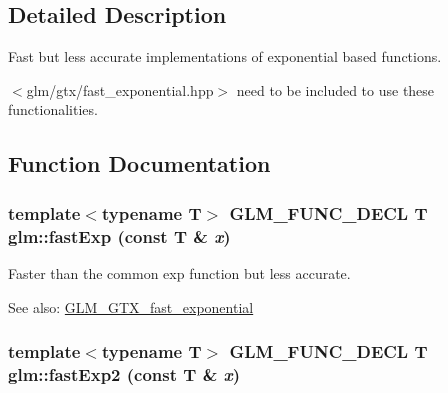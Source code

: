 \subsection{Detailed Description}
Fast but less accurate implementations of exponential based functions. 

$<$glm/gtx/fast\_\-exponential.hpp$>$ need to be included to use these functionalities. 

\subsection{Function Documentation}
\hypertarget{group__gtx__fast__exponential_g40d33b6bb8287eac031ee6226f1e2285}{
\subsubsection[fastExp]{\setlength{\rightskip}{0pt plus 5cm}template$<$typename T$>$ GLM\_\-FUNC\_\-DECL T glm::fastExp (const T \& {\em x})}}
\label{group__gtx__fast__exponential_g40d33b6bb8287eac031ee6226f1e2285}


Faster than the common exp function but less accurate. \begin{Desc}
\item[See also:]\hyperlink{group__gtx__fast__exponential}{GLM\_\-GTX\_\-fast\_\-exponential} \end{Desc}
\hypertarget{group__gtx__fast__exponential_g4279c1c329936c70e919a1d11e6125e3}{
\subsubsection[fastExp2]{\setlength{\rightskip}{0pt plus 5cm}template$<$typename T$>$ GLM\_\-FUNC\_\-DECL T glm::fastExp2 (const T \& {\em x})}}
\label{group__gtx__fast__exponential_g4279c1c329936c70e919a1d11e6125e3}


